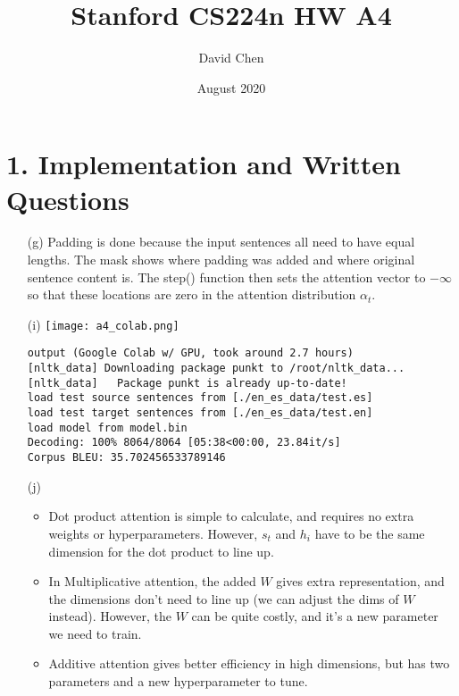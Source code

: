 \documentclass{article}
\title{Stanford CS224n HW A4}
\author{David Chen}
\date{August 2020}
\begin{document}
\maketitle

\section*{1. Implementation and Written Questions}
\begin{enumerate}[label=(\alph*)]   
\item[(g)]
Padding is done because the input sentences all need to have equal lengths. The mask shows where padding was added and where original sentence content is. The step() function then sets the attention vector to $-\infty$ so that these locations are zero in the attention distribution $\alpha_t$.

\item[(i)]
\texttt{[image: a4\_colab.png]}
\begin{verbatim}
output (Google Colab w/ GPU, took around 2.7 hours)
[nltk_data] Downloading package punkt to /root/nltk_data...
[nltk_data]   Package punkt is already up-to-date!
load test source sentences from [./en_es_data/test.es]
load test target sentences from [./en_es_data/test.en]
load model from model.bin
Decoding: 100% 8064/8064 [05:38<00:00, 23.84it/s]
Corpus BLEU: 35.702456533789146
\end{verbatim}

\item[(j)]
\begin{itemize}
    \item Dot product attention is simple to calculate, and requires no extra weights or hyperparameters. However, $s_t$ and $h_i$ have to be the same dimension for the dot product to line up.
    \item In Multiplicative attention, the added $W$ gives extra representation, and the dimensions don't need to line up (we can adjust the dims of $W$ instead). However, the $W$ can be quite costly, and it's a new parameter we need to train.
    \item Additive attention gives better efficiency in high dimensions, but has two parameters and a new hyperparameter to tune.
\end{itemize}

\end{enumerate}
\end{document}
